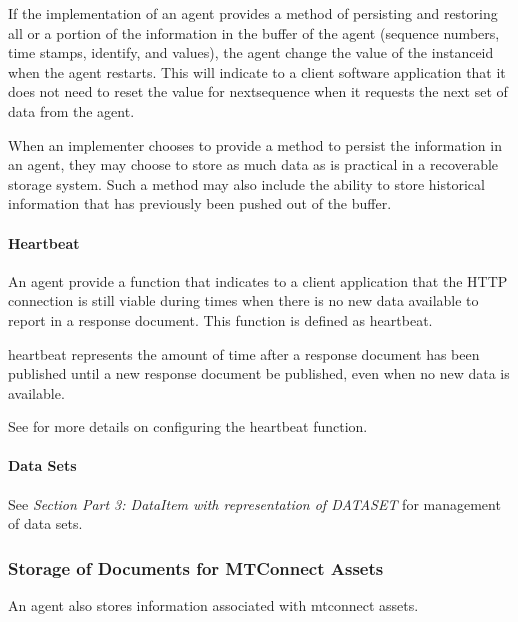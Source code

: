If the implementation of an \gls{agent} provides a method of persisting and restoring all or a portion of the information in the \gls{buffer} of the \gls{agent} (\glspl{sequence number}, \glspl{time stamp}, identify, and values), the \gls{agent} \MUSTNOT change the value of the \gls{instanceid} when the \gls{agent} restarts.  This will indicate to a client software application that it does not need to reset the value for \gls{nextsequence} when it requests the next set of data from the \gls{agent}.

When an implementer chooses to provide a method to persist the information in an \gls{agent}, they may choose to store as much data as is practical in a recoverable storage system.  Such a method may also include the ability to store historical information that has previously been pushed out of the \gls{buffer}.

\paragraph{Heartbeat}\mbox{}

An \gls{agent} \MUST provide a function that indicates to a client application that the HTTP connection is still viable during times when there is no new data available to report in a \gls{response document}.  This function is defined as \gls{heartbeat}.

\gls{heartbeat} represents the amount of time after a \gls{response document} has been published until a new \gls{response document} \MUST be published, even when no new data is available.

See  for more details on configuring the \gls{heartbeat} function.

\paragraph{Data Sets}\mbox{}
\label{sec:Data Sets}

See  \textit{Section Part 3: DataItem with representation of DATA\textunderscore SET} for management of \glspl{data set}.


\subsubsection{Storage of Documents for MTConnect Assets}

An \gls{agent} also stores information associated with \glspl{mtconnect asset}.

